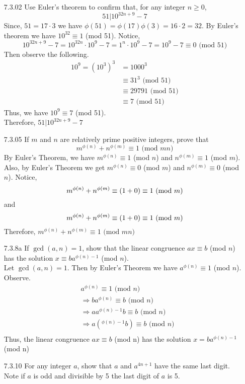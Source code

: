 \documentclass[12pt]{article}
\begin{document}
\begin{enumerate}
	\item[7.3.02] Use Euler's theorem to confirm that, for any integer $ n \geq 0 $,
	\[51|10^{32n+9}-7\]
	Since, $ 51 = 17\cdot3$ we have $ \phi(51)=\phi(17)\phi(3)=16\cdot2=32 $. By Euler's theorem we have $ 10^{32} \equiv 1 $ (mod 51). Notice,
		\[10^{32n+9}-7 = 10^{32n}\cdot10^9-7 = 1^n \cdot 10^9-7=10^9-7\equiv0 \text{ (mod 51)}\]
	Then observe the following. 
	\begin{align*}
		10^9=(10^3)^3 &= 1000^3 \\
			&\equiv 31^3 \text{ (mod 51)}\\
			&\equiv 29791 \text{ (mod 51)}\\
	    	&\equiv 7 \text{ (mod 51)}
	\end{align*}
	Thus, we have $ 10^9 \equiv 7 $ (mod 51).\\
	Therefore, $51|10^{32n+9}-7$
		
	\item[7.3.05] If $ m $ and $ n $ are relatively prime positive integers, prove that
	\[m^{\phi(n)}+n^{\phi(m)}\equiv 1 \text{ (mod $mn  $)} \]
		By Euler's Theorem, we have $ m^{\phi(n)}\equiv1 $ (mod $ n $) and $ n^{\phi(m)}\equiv 1 $ (mod $ m $). Also, by Euler's Theorem we get $ m^{\phi(n)} \equiv 0$ (mod $ m $) and $ n^{\phi(m)}\equiv0 $ (mod $ n $). Notice,
		\[m^{\phi(n)}+n^{\phi(m)}\equiv(1+0)\equiv 1 \text{ (mod $ m $)} \]
		and
		\[m^{\phi(n)}+n^{\phi(m)}\equiv(1+0)\equiv 1 \text{ (mod $ m $)} \]
		Therefore, $m^{\phi(n)}+n^{\phi(m)}\equiv 1 \text{ (mod $mn  $)}$
	
	\item[7.3.8a] If $ \gcd(a,n)=1 $, show that the linear congruence $ ax \equiv b$ (mod $ n $) has the solution $ x \equiv ba^{\phi(n)-1} $ (mod $ n $).\\
	Let $ \gcd(a,n)=1 $. Then by Euler's Theorem we have $ a^{\phi(n)} \equiv 1 $ (mod $n$). Observe. 
	\begin{align*}
		 &a^{\phi(n)}  \equiv 1 \text{ (mod $n$)}\\
		 &\Rightarrow ba^{\phi(n)} \equiv b \text{ (mod $n$)}\\
		 &\Rightarrow aa^{\phi(n)-1}b \equiv b \text{ (mod $n$)}\\
		 &\Rightarrow a(^{\phi(n)-1}b) \equiv b \text{ (mod $n$)}\\
	\end{align*}
	Thus, the linear congruence $ ax\equiv b $ (mod n) has the solution $ x=ba^{\phi(n)-1} $ (mod n)
	
	\item[7.3.10] For any integer $ a $, show that $ a $ and $ a^{4n+1} $ have the same last digit.
	\\
	Note if $ a $ is odd and divisible by 5 the last digit of $ a $ is 5.
\end{enumerate}
\end{document}
